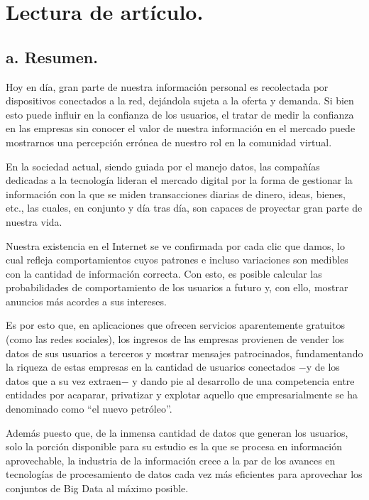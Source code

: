 \section{Lectura de artículo.}
\subsection*{a. Resumen.}

Hoy en día, gran parte de nuestra información personal es recolectada por dispositivos conectados a la red, dejándola sujeta a la oferta y demanda. Si bien esto puede influir en la confianza de los usuarios, el tratar de medir la confianza en las empresas sin conocer el valor de nuestra información en el mercado puede mostrarnos una percepción errónea de nuestro rol en la comunidad virtual.

En la sociedad actual, siendo guiada por el manejo datos, las compañías dedicadas a la tecnología lideran el mercado digital por la forma de gestionar la información con la que se miden transacciones diarias de dinero, ideas, bienes, etc., las cuales, en conjunto y día tras día, son capaces de proyectar gran parte de nuestra vida.

Nuestra existencia en el Internet se ve confirmada por cada clic que damos, lo cual refleja comportamientos cuyos patrones e incluso variaciones son medibles con la cantidad de información correcta. Con esto, es posible calcular las probabilidades de comportamiento de los usuarios a futuro y, con ello, mostrar anuncios más acordes a sus intereses.

Es por esto que, en aplicaciones que ofrecen servicios aparentemente gratuitos (como las redes sociales), los ingresos de las empresas provienen de vender los datos de sus usuarios a terceros y mostrar mensajes patrocinados, fundamentando la riqueza de estas empresas en la cantidad de usuarios conectados $-$y de los datos que a su vez extraen$-$ y dando pie al desarrollo de una competencia entre entidades por acaparar, privatizar y explotar aquello que empresarialmente se ha denominado como “el nuevo petróleo”.

Además puesto que, de la inmensa cantidad de datos que generan los usuarios, solo la porción disponible para su estudio es la que se procesa en información aprovechable, la industria de la información crece a la par de los avances en tecnologías de procesamiento de datos cada vez más eficientes para aprovechar los conjuntos de Big Data al máximo posible.


